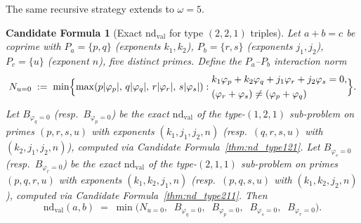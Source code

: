 \documentclass[12pt]{article}
\newtheorem{candidate}{Candidate Formula}
\theoremstyle{definition}
\begin{document}
The same recursive strategy extends to $\omega=5$.

\begin{candidate}[Exact $\mathrm{nd}_{\mathrm{val}}$ for type $(2,2,1)$ triples]\label{thm:nd_type221}
  Let $a + b = c$ be coprime with $P_a = \{p, q\}$ (exponents $k_1, k_2$),
  $P_b = \{r, s\}$ (exponents $j_1, j_2$), $P_c = \{u\}$ (exponent $n$),
  five distinct primes.  Define the \emph{$P_a$--$P_b$ interaction norm}
  \[
    N_{u=0} \;:=\; \min\Bigl\{
      \max(p|\varphi_p|,\,q|\varphi_q|,\,r|\varphi_r|,\,s|\varphi_s|) :
      \begin{aligned}
        &k_1\varphi_p + k_2\varphi_q + j_1\varphi_r + j_2\varphi_s = 0,\\
        &(\varphi_r + \varphi_s) \ne (\varphi_p + \varphi_q)
      \end{aligned}
    \Bigr\}.
  \]
  Let $B_{\varphi_q=0}$ (resp.~$B_{\varphi_p=0}$) be the exact $\mathrm{nd}_{\mathrm{val}}$ of the
  type-$(1,2,1)$ sub-problem on primes $(p,r,s,u)$ with exponents $(k_1,j_1,j_2,n)$
  (resp.~$(q,r,s,u)$ with $(k_2,j_1,j_2,n)$), computed via
  Candidate Formula~\ref{thm:nd_type121}.
  Let $B_{\varphi_s=0}$ (resp.~$B_{\varphi_r=0}$) be the exact $\mathrm{nd}_{\mathrm{val}}$ of the
  type-$(2,1,1)$ sub-problem on primes $(p,q,r,u)$ with exponents $(k_1,k_2,j_1,n)$
  (resp.~$(p,q,s,u)$ with $(k_1,k_2,j_2,n)$), computed via
  Candidate Formula~\ref{thm:nd_type211}.  Then
  \[
    \mathrm{nd}_{\mathrm{val}}(a,b) \;=\; \min\!\bigl(
      N_{u=0},\;\;
      B_{\varphi_q=0},\;\;
      B_{\varphi_p=0},\;\;
      B_{\varphi_s=0},\;\;
      B_{\varphi_r=0}
    \bigr).
  \]
\end{candidate}
\end{document}
